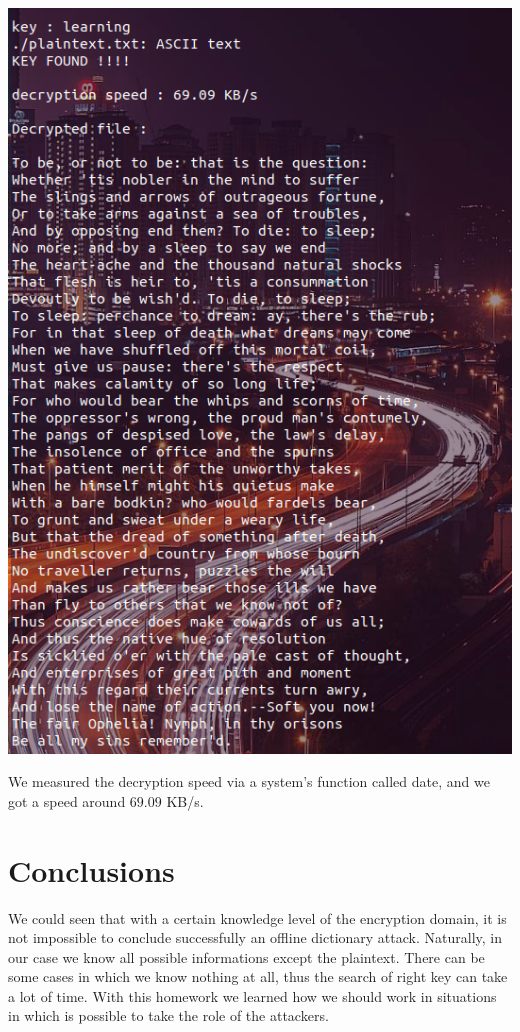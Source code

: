 \documentclass[11pt]{article}
\begin{document}
\begin{center}
\includegraphics[scale=0.4]{./successfully_attack.png}
\end{center}
We measured the decryption speed via a system's function called date, and we got a speed around $69.09$ KB/s.
\section{Conclusions}
We could seen that with a certain knowledge level of the encryption domain, it is not impossible to conclude successfully an offline dictionary attack. Naturally, in our case we know all possible informations except the plaintext. There can be some cases in which we know nothing at all, thus the search of right key can take a lot of time. With this homework we learned how we should work in situations in which is possible to take the role of the attackers.
\end{document}

